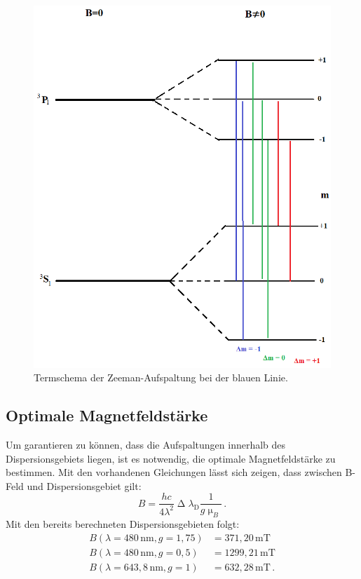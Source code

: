 \begin{figure}
  \centering
  \includegraphics[scale=0.4]{Bilder/2Termschema.png}
  \caption{Termschema der Zeeman-Aufspaltung bei der blauen Linie.}
  \label{fig:blue}
\end{figure}

\subsection{Optimale Magnetfeldstärke}
Um garantieren zu können, dass die Aufspaltungen innerhalb des Dispersionsgebiets liegen, ist es notwendig, die optimale Magnetfeldstärke zu bestimmen. Mit den vorhandenen Gleichungen lässt sich zeigen, dass zwischen B-Feld und Dispersionsgebiet gilt:
\begin{equation}
B=\frac{hc}{4\lambda^2}\upDelta\lambda_\text{D}\frac{1}{g\upmu_B}\,.
\end{equation}
Mit den bereits berechneten Dispersionsgebieten folgt:
\begin{align*}
B\left(\lambda=480\,\si{\nm}, g=1{,}75\right)&=371{,}20\,\si{\milli\tesla}\\
B\left(\lambda=480\,\si{\nm}, g=0{,}5\right)&=1299{,}21\,\si{\milli\tesla}\\
B\left(\lambda=643{,}8\,\si{\nm}, g=1\right)&=632{,}28\,\si{\milli\tesla}\,.
\end{align*}
\clearpage
